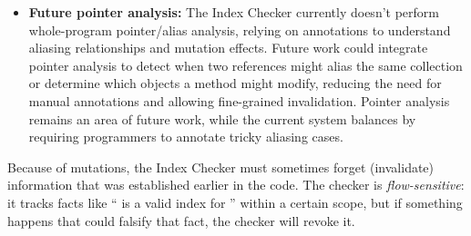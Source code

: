 \begin{itemize}
\item
  \textbf{Future pointer analysis:}
  The Index Checker currently doesn't perform whole-program pointer/alias analysis, relying
  on annotations to understand aliasing relationships and mutation effects. Future work
  could integrate pointer analysis to detect when two references might alias the same
  collection or determine which objects a method might modify, reducing the need for manual
  annotations and allowing fine-grained invalidation. Pointer analysis remains an area of
  future work, while the current system balances by requiring programmers to annotate tricky
  aliasing cases.
\end{itemize}


Because of mutations, the Index Checker must sometimes forget (invalidate) information that was
established earlier in the code. The checker is \emph{flow-sensitive}: it tracks facts like
“ is a valid index for ” within a certain scope, but if something happens
that could falsify that fact, the checker will revoke it.
